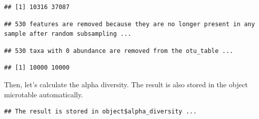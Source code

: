 \documentclass[
]{book}
\newenvironment{Shaded}{\begin{snugshade}}{\end{snugshade}}
\newcommand{\AttributeTok}[1]{\textcolor[rgb]{0.13,0.29,0.53}{#1}}
\newcommand{\CommentTok}[1]{\textcolor[rgb]{0.56,0.35,0.01}{\textit{#1}}}
\newcommand{\ConstantTok}[1]{\textcolor[rgb]{0.56,0.35,0.01}{#1}}
\newcommand{\DecValTok}[1]{\textcolor[rgb]{0.00,0.00,0.81}{#1}}
\newcommand{\FunctionTok}[1]{\textcolor[rgb]{0.13,0.29,0.53}{\textbf{#1}}}
\newcommand{\NormalTok}[1]{#1}
\newcommand{\SpecialCharTok}[1]{\textcolor[rgb]{0.81,0.36,0.00}{\textbf{#1}}}
\begin{document}
\begin{verbatim}
## [1] 10316 37087
\end{verbatim}

\begin{Shaded}
\end{Shaded}

\begin{verbatim}
## 530 features are removed because they are no longer present in any sample after random subsampling ...
\end{verbatim}

\begin{verbatim}
## 530 taxa with 0 abundance are removed from the otu_table ...
\end{verbatim}

\begin{Shaded}
\end{Shaded}

\begin{verbatim}
## [1] 10000 10000
\end{verbatim}

Then, let's calculate the alpha diversity.
The result is also stored in the object microtable automatically.

\begin{Shaded}
\end{Shaded}

\begin{verbatim}
## The result is stored in object$alpha_diversity ...
\end{verbatim}

\begin{Shaded}
\end{Shaded}
\end{document}

